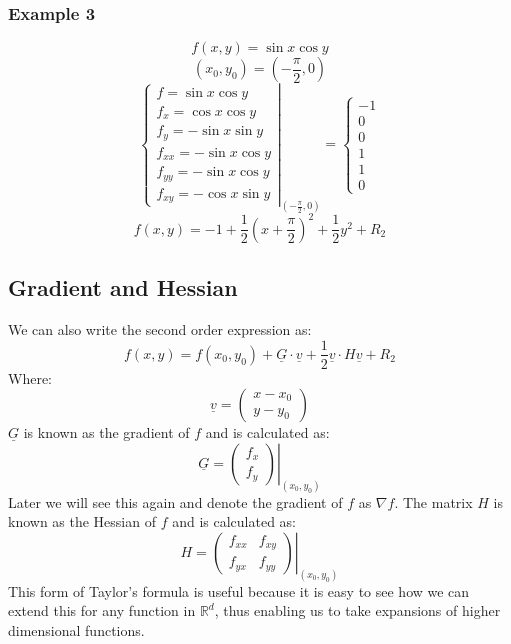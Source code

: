 \documentclass[12pt]{article}
\begin{document}
\subsubsection*{Example 3}
\[f(x,y)=\sin x\cos{y}\]
\[(x_0,y_0)=\left(-\frac{\pi}{2},0\right)\]
\[\left.\begin{cases}
    f=\sin{x}\cos{y} \\
    f_x=\cos{x}\cos{y} \\
    f_y=-\sin{x}\sin{y} \\
    f_{xx}=-\sin{x}\cos{y} \\
    f_{yy}=-\sin{x}\cos{y} \\
    f_{xy}=-\cos{x}\sin{y}
\end{cases}\right\rvert_{\left(-\frac{\pi}{2},0\right)}=\begin{cases}
    -1 \\ 0 \\ 0 \\ 1 \\ 1 \\ 0
\end{cases}\]
\[f(x,y)=-1+\frac{1}{2}\left(x+\frac{\pi}{2}\right)^2+\frac{1}{2}y^2+R_2\]
\subsection*{Gradient and Hessian}
We can also write the second order expression as:
\[f(x,y)=f(x_0,y_0)+\underline{G}\cdot \underline{v}+\frac{1}{2}\underline{v}\cdot H\underline{v}+R_2\]
Where:
\[\underline{v}=\begin{pmatrix}
    x-x_0 \\
    y-y_0
\end{pmatrix}\]
\(\underline{G}\) is known as the gradient of \(f\) and is calculated as:
\[\underline{G}=\left.\begin{pmatrix}
    f_x \\
    f_y
\end{pmatrix}\right\rvert_{(x_0,y_0)}\]
Later we will see this again and denote the gradient of \(f\) as \(\nabla f\). The matrix \(H\) is known as the Hessian of \(f\) and is calculated as:
\[H=\left.\begin{pmatrix}
    f_{xx} & f_{xy} \\
    f_{yx} & f_{yy}
\end{pmatrix}\right\rvert_{(x_0,y_0)}\]
This form of Taylor's formula is useful because it is easy to see how we can extend this for any function in \(\mathbb{R}^d\), thus enabling us to take expansions of higher dimensional functions.
\end{document}
